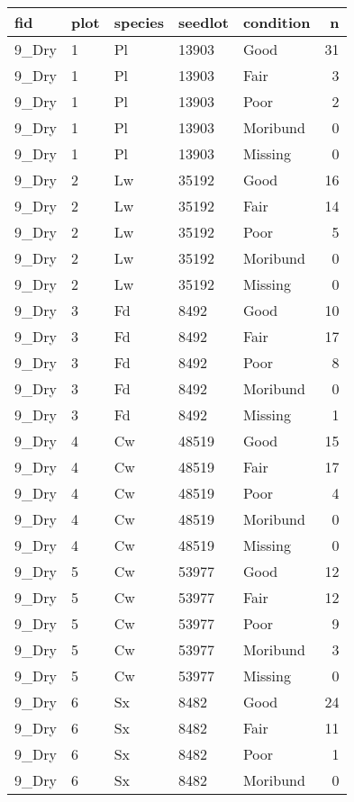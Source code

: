 \documentclass[
]{article}
\begin{document}
\begin{tabular}{l|l|l|l|l|r}
\hline
fid & plot & species & seedlot & condition & n\\
\hline
9\_Dry & 1 & Pl & 13903 & Good & 31\\
\hline
9\_Dry & 1 & Pl & 13903 & Fair & 3\\
\hline
9\_Dry & 1 & Pl & 13903 & Poor & 2\\
\hline
9\_Dry & 1 & Pl & 13903 & Moribund & 0\\
\hline
9\_Dry & 1 & Pl & 13903 & Missing & 0\\
\hline
9\_Dry & 2 & Lw & 35192 & Good & 16\\
\hline
9\_Dry & 2 & Lw & 35192 & Fair & 14\\
\hline
9\_Dry & 2 & Lw & 35192 & Poor & 5\\
\hline
9\_Dry & 2 & Lw & 35192 & Moribund & 0\\
\hline
9\_Dry & 2 & Lw & 35192 & Missing & 0\\
\hline
9\_Dry & 3 & Fd & 8492 & Good & 10\\
\hline
9\_Dry & 3 & Fd & 8492 & Fair & 17\\
\hline
9\_Dry & 3 & Fd & 8492 & Poor & 8\\
\hline
9\_Dry & 3 & Fd & 8492 & Moribund & 0\\
\hline
9\_Dry & 3 & Fd & 8492 & Missing & 1\\
\hline
9\_Dry & 4 & Cw & 48519 & Good & 15\\
\hline
9\_Dry & 4 & Cw & 48519 & Fair & 17\\
\hline
9\_Dry & 4 & Cw & 48519 & Poor & 4\\
\hline
9\_Dry & 4 & Cw & 48519 & Moribund & 0\\
\hline
9\_Dry & 4 & Cw & 48519 & Missing & 0\\
\hline
9\_Dry & 5 & Cw & 53977 & Good & 12\\
\hline
9\_Dry & 5 & Cw & 53977 & Fair & 12\\
\hline
9\_Dry & 5 & Cw & 53977 & Poor & 9\\
\hline
9\_Dry & 5 & Cw & 53977 & Moribund & 3\\
\hline
9\_Dry & 5 & Cw & 53977 & Missing & 0\\
\hline
9\_Dry & 6 & Sx & 8482 & Good & 24\\
\hline
9\_Dry & 6 & Sx & 8482 & Fair & 11\\
\hline
9\_Dry & 6 & Sx & 8482 & Poor & 1\\
\hline
9\_Dry & 6 & Sx & 8482 & Moribund & 0\\

\end{tabular}
\end{document}
